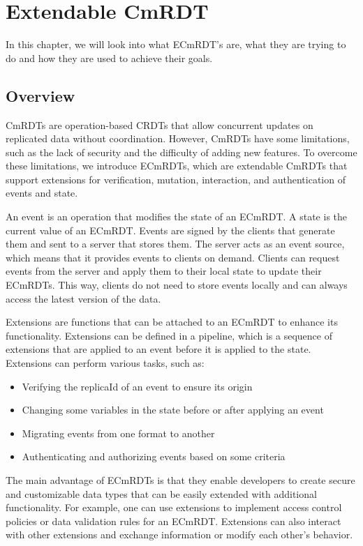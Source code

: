 \documentclass[
	ngerman,
	ruledheaders=section,   %
	class=report,		    %
	thesis={type=bachelor}, %
	accentcolor=9c,			%
	custommargins=true,    %
	marginpar=false,        %
	parskip=half-,          %
	fontsize=11pt,          %
]{tudapub}
\begin{document}
\chapter{Extendable CmRDT}
In this chapter, we will look into what ECmRDT's are, what they are trying to do and how they are used to achieve their goals.

\section{Overview}
CmRDTs are operation-based CRDTs that allow concurrent updates on replicated data without coordination. However, CmRDTs have some limitations, such as the lack of security and the difficulty of adding new features. To overcome these limitations, we introduce ECmRDTs, which are extendable CmRDTs that support extensions for verification, mutation, interaction, and authentication of events and state.

An event is an operation that modifies the state of an ECmRDT. A state is the current value of an ECmRDT. Events are signed by the clients that generate them and sent to a server that stores them. The server acts as an event source, which means that it provides events to clients on demand. Clients can request events from the server and apply them to their local state to update their ECmRDTs. This way, clients do not need to store events locally and can always access the latest version of the data.

Extensions are functions that can be attached to an ECmRDT to enhance its functionality. Extensions can be defined in a pipeline, which is a sequence of extensions that are applied to an event before it is applied to the state. Extensions can perform various tasks, such as:

\begin{itemize}
  \item Verifying the replicaId of an event to ensure its origin
  \item Changing some variables in the state before or after applying an event
  \item Migrating events from one format to another
  \item Authenticating and authorizing events based on some criteria
\end{itemize}

The main advantage of ECmRDTs is that they enable developers to create secure and customizable data types that can be easily extended with additional functionality. For example, one can use extensions to implement access control policies or data validation rules for an ECmRDT. Extensions can also interact with other extensions and exchange information or modify each other’s behavior.
\end{document}
